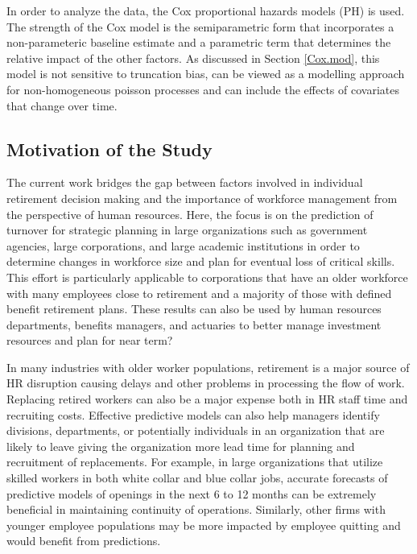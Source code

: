 In order to analyze the data, the Cox proportional hazards models (PH) is used.  The strength of the Cox model is the semiparametric form that incorporates a non-parameteric baseline estimate and a parametric term that determines the relative impact of the other factors. As discussed in Section \ref{Cox.mod}, this model is not sensitive to truncation bias, can be viewed as a modelling approach for non-homogeneous poisson processes and can include the effects of covariates that change over time.

\subsection{Motivation of the Study}

The current work bridges the gap between factors involved in individual retirement decision making and the importance of workforce management from the perspective of human resources.  Here, the focus is on the prediction of turnover for strategic planning in large organizations such as government agencies, large corporations, and large academic institutions in order to determine changes in workforce size and plan for eventual loss of critical skills. This effort is particularly applicable to corporations that have an older workforce with many employees close to retirement and a majority of those with defined benefit retirement plans.  These results can also be used by human resources departments, benefits managers, and actuaries to better manage investment resources and plan for near term?

In many industries with older worker populations, retirement is a major source of HR disruption causing delays and other problems in processing the flow of work.  Replacing retired workers can also be a major expense both in HR staff time and recruiting costs.  Effective predictive models can also help managers identify divisions, departments, or potentially individuals in an organization that are likely to leave giving the organization more lead time for planning and recruitment of replacements.  For example, in large organizations that utilize skilled workers in both white collar and blue collar jobs, accurate forecasts of predictive models of openings in the next 6 to 12 months can be extremely beneficial in maintaining continuity of operations.  Similarly, other firms with younger employee populations may be more impacted by employee quitting and would benefit from predictions.

